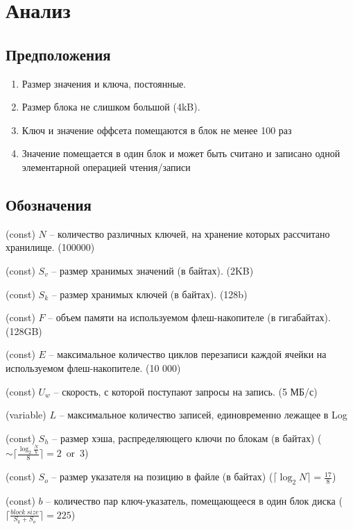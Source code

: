 \section*{Анализ}

\subsection*{Предположения}
\begin{enumerate}
	\item Размер значения и ключа, постоянные.
	
	\item Размер блока не слишком большой (4kB).
	
	\item Ключ и значение оффсета помещаются в блок не менее 100 раз
	
	\item Значение помещается в один блок и может быть считано и записано одной элементарной операцией чтения/записи
	
\end{enumerate}
\newpage
\subsection*{Обозначения}

(const) $N$ -- количество различных ключей, на хранение которых рассчитано хранилище. (100000)

(const) $S_v$ -- размер хранимых значений (в байтах). (2KB)

(const) $S_k$ -- размер хранимых ключей (в байтах). (128b)

(const) $F$ -- объем памяти на используемом флеш-накопителе (в гигабайтах). (128GB)

(const) $E$ -- максимальное количество циклов перезаписи каждой ячейки на используемом флеш-накопителе. (10 000)

(const) $U_w$ -- скорость, с которой поступают запросы на запись. (5 МБ/с)

(variable) $L$ -- максимальное количество записей, единовременно лежащее в Log

(const) $S_h$ -- размер хэша, распределяющего ключи по блокам (в байтах) ($\sim\lceil\frac{\log_2 \frac{N}{b}}{8}\rceil = 2\ \operatorname{or}\ 3$)

(const) $S_o$ -- размер указателя на позицию в файле (в байтах) ($ \lceil\log_2N\rceil = \frac{17}{8}$)

(const) $b$ -- количество пар ключ-указатель, помещающееся в один блок диска ($\lceil\frac{block\ size}{S_k + S_o}\rceil = 225$)

